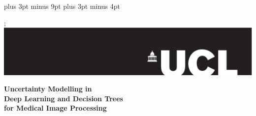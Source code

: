 \documentclass[12pt,a4paper,twoside]{book}
\newcommand{\HRule}{\rule{\linewidth}{0.5mm}}
\newcommand{\FrontPageStyle}{\pagestyle{empty}}
\begin{document}
\belowdisplayskip=12pt plus 3pt minus 9pt
\belowdisplayshortskip=7pt plus 3pt minus 4pt

\FrontPageStyle{}

\begin{titlepage}
\begin{center}

% 
% 

\vspace*{-9em}; 
\hbox{ \hspace*{-18em} \includegraphics[width=1.7\textwidth]{images/univ_logo-eps-converted-to.pdf}}
\null%
\vspace*{7em}%

{\Large 

{ \Huge \textbf{ Uncertainty Modelling in\\ Deep Learning and Decision Trees \\ for Medical Image Processing}\\ [0.4cm]}




}
\end{center}
\end{titlepage}
\end{document}
